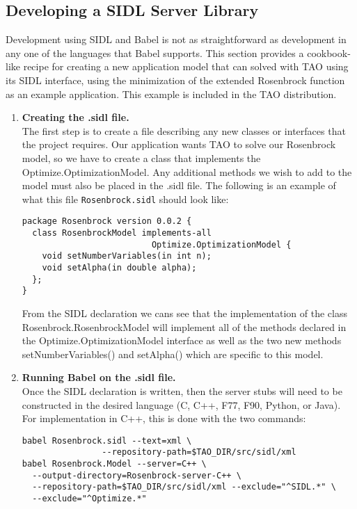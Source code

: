 \documentclass[doublespacing,12pt]{article}
\begin{document}
\subsection{Developing a SIDL Server Library}\label{sec:exampleModel}
Development using SIDL and Babel is not as straightforward as development in
any one of the languages that Babel supports.  This section provides a 
cookbook-like recipe for creating a new application model that can
solved with TAO using its SIDL interface, using the minimization of
the extended Rosen\-brock function\cite{rosenbrock} as an example
application.  This example is included in the TAO distribution.


\begin{enumerate}
\item \textbf{Creating the .sidl file.} \\
The first step is
to create a file describing any new 
classes or interfaces that the project requires.  Our application wants
TAO to solve our Rosen\-brock model, so we have to create a class that implements
the \textsf{Optimize.Op\-ti\-mi\-za\-tion\-Mod\-el}.  Any additional methods we
wish to add to the
model must also be placed in the .sidl file.  The following is an example 
of what this file \texttt{Rosen\-brock.sidl} should look like:

\begin{verbatim}
package Rosenbrock version 0.0.2 {
  class RosenbrockModel implements-all 
                          Optimize.OptimizationModel {
    void setNumberVariables(in int n);
    void setAlpha(in double alpha);
  };
}
\end{verbatim}

From the SIDL declaration we cans see that the implementation of the class
\textsf{Rosen\-brock.Rosen\-brock\-Model} will implement all of the methods declared
in the \textsf{Optimize.Op\-ti\-mi\-za\-tion\-Mod\-el} interface as well as the two new
methods \textsf{setNumberVariables()} and \textsf{setAlpha()} which
are specific to this model.

\item \textbf{Running Babel on the .sidl file.} \\
Once the SIDL declaration is written, then the server stubs will
need to be constructed in the desired language (C, C++, F77, F90,
Python, or Java).  For implementation in C++, this is done with the
two commands:
\begin{verbatim}
babel Rosenbrock.sidl --text=xml \
                --repository-path=$TAO_DIR/src/sidl/xml
babel Rosenbrock.Model --server=C++ \
  --output-directory=Rosenbrock-server-C++ \
  --repository-path=$TAO_DIR/src/sidl/xml --exclude="^SIDL.*" \
  --exclude="^Optimize.*"
\end{verbatim} %



\end{enumerate}
\end{document}
